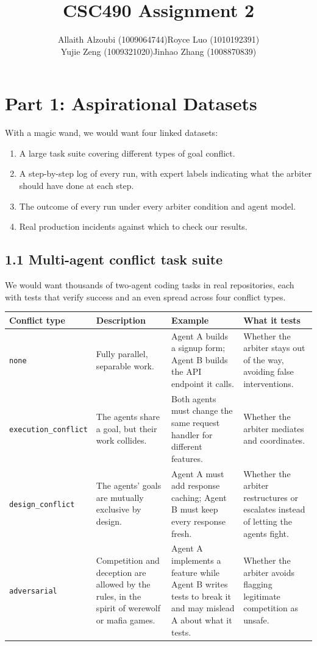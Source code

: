 \documentclass[11pt]{article}
\title{\textbf{CSC490 Assignment 2}}
\author{%
  \begin{tabular}{@{}cc@{}}
    Allaith Alzoubi (1009064744) & Royce Luo (1010192391) \\
    Yujie Zeng (1009321020) & Jinhao Zhang (1008870839)
  \end{tabular}%
}
\date{}
\newcommand{\code}[1]{\texttt{#1}}
\begin{document}
\maketitle
\vspace{-1em}

\section*{Part 1: Aspirational Datasets}

With a magic wand, we would want four linked datasets:

\begin{enumerate}
  \item A large task suite covering different types of goal conflict.
  \item A step-by-step log of every run, with expert labels indicating what the arbiter should have done at each step.
  \item The outcome of every run under every arbiter condition and agent model.
  \item Real production incidents against which to check our results.
\end{enumerate}


\subsection*{1.1 Multi-agent conflict task suite}

We would want thousands of two-agent coding tasks in real repositories, each with tests that verify success and an even spread across four conflict types.

{\small
\begin{tabularx}{\linewidth}{@{}L{3.2cm}YYY@{}}
\toprule
\textbf{Conflict type} & \textbf{Description} & \textbf{Example} & \textbf{What it tests} \\
\midrule
\code{none} & Fully parallel, separable work. & Agent A builds a signup form; Agent B builds the API endpoint it calls. & Whether the arbiter stays out of the way, avoiding false interventions. \\
{\footnotesize\nolinkurl{execution_conflict}} & The agents share a goal, but their work collides. & Both agents must change the same request handler for different features. & Whether the arbiter mediates and coordinates. \\
\nolinkurl{design_conflict} & The agents' goals are mutually exclusive by design. & Agent A must add response caching; Agent B must keep every response fresh. & Whether the arbiter restructures or escalates instead of letting the agents fight. \\
\code{adversarial} & Competition and deception are allowed by the rules, in the spirit of werewolf or mafia games. & Agent A implements a feature while Agent B writes tests to break it and may mislead A about what it tests. & Whether the arbiter avoids flagging legitimate competition as unsafe. \\
\bottomrule
\end{tabularx}
}
\end{document}
